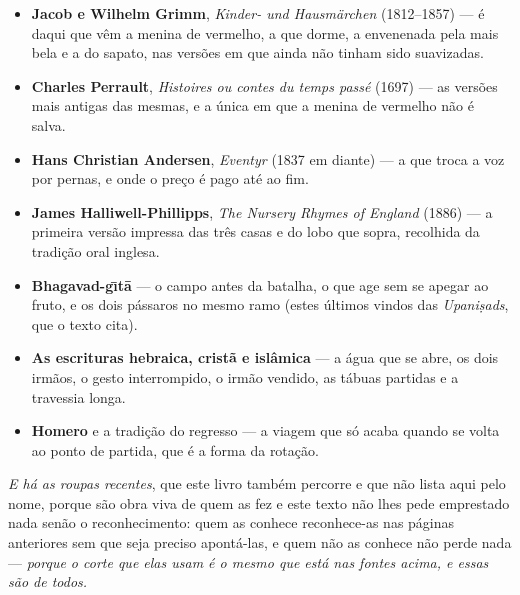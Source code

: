 \documentclass[livro.tex]{subfiles}
\begin{document}
\begin{itemize}\itemsep3pt
\item \textbf{Jacob e Wilhelm Grimm}, \emph{Kinder- und Hausmärchen} (1812--1857) --- é daqui que
vêm a menina de vermelho, a que dorme, a envenenada pela mais bela e a do sapato, nas versões em
que ainda não tinham sido suavizadas.
\item \textbf{Charles Perrault}, \emph{Histoires ou contes du temps passé} (1697) --- as versões
mais antigas das mesmas, e a única em que a menina de vermelho não é salva.
\item \textbf{Hans Christian Andersen}, \emph{Eventyr} (1837 em diante) --- a que troca a voz por
pernas, e onde o preço é pago até ao fim.
\item \textbf{James Halliwell-Phillipps}, \emph{The Nursery Rhymes of England} (1886) --- a
primeira versão impressa das três casas e do lobo que sopra, recolhida da tradição oral inglesa.
\item \textbf{Bhagavad-g\=\i t\=a} --- o campo antes da batalha, o que age sem se apegar ao fruto,
e os dois pássaros no mesmo ramo (estes últimos vindos das \emph{Upani\d{s}ads}, que o texto cita).
\item \textbf{As escrituras hebraica, cristã e islâmica} --- a água que se abre, os dois irmãos, o
gesto interrompido, o irmão vendido, as tábuas partidas e a travessia longa.
\item \textbf{Homero} e a tradição do regresso --- a viagem que só acaba quando se volta ao ponto
de partida, que é a forma da rotação.
\end{itemize}

\noindent \emph{E há as roupas recentes}, que este livro também percorre e que não lista aqui pelo
nome, porque são obra viva de quem as fez e este texto não lhes pede emprestado nada senão o
reconhecimento: quem as conhece reconhece-as nas páginas anteriores sem que seja preciso
apontá-las, e quem não as conhece não perde nada --- \emph{porque o corte que elas usam é o mesmo
que está nas fontes acima, e essas são de todos.}
\end{document}
